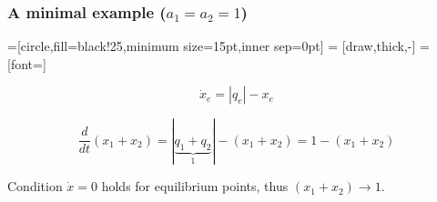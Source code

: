 \documentclass[	hyperref={pdfpagelabels=false}, xcolor=dvipsnames,
		11pt]{beamer}
\begin{document}
\begin{frame}
    \frametitle{A minimal example ($a_1 = a_2 = 1$)} 
      
      =[circle,fill=black!25,minimum size=15pt,inner sep=0pt]
       = [draw,thick,-]
       = [font=\small]
     

\begin{figure}[ht]
\begin{minipage}[b]{0.45\linewidth}
\centering
	  \begin{equation}  
	    \dot{x}_e = |q_e| - x_e  \nonumber
	  \end{equation}

\label{fig:figure1}
\end{minipage}
\hspace{0.5cm}
\begin{minipage}[b]{0.45\linewidth}
\centering

\label{fig:figure2}
\end{minipage}
\end{figure}

 \vspace{-0.75cm}

      \begin{equation}
	\frac{d}{dt} (x_1 + x_2) = |\underbrace{q_1 + q_2}_{1}| - (x_1 + x_2) = 1 - (x_1 + x_2) \nonumber
      \end{equation}

     
  
       Condition \alert{$\dot{x} = 0$ holds for equilibrium points}, thus $(x_1+x_2) \to 1$.
       


 \vspace{-0.75cm}     
  

\end{frame}
\end{document}
